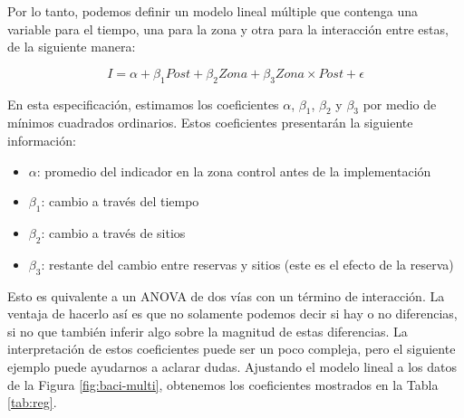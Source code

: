 \documentclass[]{krantz}
\providecommand{\tightlist}{%
  \setlength{\itemsep}{0pt}\setlength{\parskip}{0pt}}
\begin{document}
Por lo tanto, podemos definir un modelo lineal múltiple que contenga una
variable para el tiempo, una para la zona y otra para la interacción
entre estas, de la siguiente manera:

\begin{equation} 
I = \alpha + \beta_1Post + \beta_2Zona + \beta_3Zona \times Post + \epsilon
\label{eq:did}
\end{equation}

En esta especificación, estimamos los coeficientes \(\alpha\),
\(\beta_1\), \(\beta_2\) y \(\beta_3\) por medio de mínimos cuadrados
ordinarios. Estos coeficientes presentarán la siguiente información:

\begin{itemize}
\tightlist
\item
  \(\alpha\): promedio del indicador en la zona control antes de la
  implementación
\item
  \(\beta_1\): cambio a través del tiempo
\item
  \(\beta_2\): cambio a través de sitios
\item
  \(\beta_3\): restante del cambio entre reservas y sitios (este es el
  efecto de la reserva)
\end{itemize}

Esto es quivalente a un ANOVA de dos vías con un término de interacción.
La ventaja de hacerlo así es que no solamente podemos decir si hay o no
diferencias, si no que también inferir algo sobre la magnitud de estas
diferencias. La interpretación de estos coeficientes puede ser un poco
compleja, pero el siguiente ejemplo puede ayudarnos a aclarar dudas.
Ajustando el modelo lineal a los datos de la Figura
\ref{fig:baci-multi}, obtenemos los coeficientes mostrados en la Tabla
\ref{tab:reg}.
\end{document}

